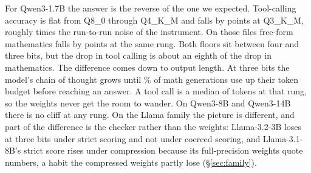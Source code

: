\documentclass[12pt,letterpaper]{article}
\newcommand{\qm}{Qwen3-1.7B}
\begin{document}
For \qm{} the answer is the reverse of the one we expected. Tool-calling accuracy is flat from Q8\_0 through Q4\_K\_M and falls by \qtDropThree{} points at Q3\_K\_M, roughly \qtCliffOverNoise{} times the run-to-run noise of the instrument. On those files free-form mathematics falls by \qtGsmDropThree{} points at the same rung. Both floors sit between four and three bits, but the drop in tool calling is about an eighth of the drop in mathematics. The difference comes down to output length. At three bits the model's chain of thought \citep{wei2022cot} grows until \qtGsmTruncPctThree{}\% of math generations use up their token budget before reaching an answer. A tool call is a median of \qtToolNgenMedThree{} tokens at that rung, so the weights never get the room to wander. On Qwen3-8B and Qwen3-14B there is no cliff at any rung. On the Llama family the picture is different, and part of the difference is the checker rather than the weights: Llama-3.2-3B loses at three bits under strict scoring and not under coerced scoring, and Llama-3.1-8B's strict score rises under compression because its full-precision weights quote numbers, a habit the compressed weights partly lose (\S\ref{sec:family}).
\end{document}
